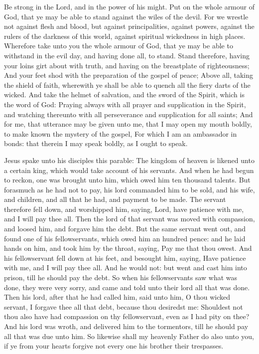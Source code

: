  Be strong in the Lord, and in the power of his might. Put on the whole armour of God, that ye may be able to stand against the wiles of the devil. For we wrestle not against flesh and blood, but against principalities, against powers, against the rulers of the darkness of this world, against spiritual wickedness in high places. Wherefore take unto you the whole armour of God, that ye may be able to withstand in the evil day, and having done all, to stand. Stand therefore, having your loins girt about with truth, and having on the breastplate of righteousness; And your feet shod with the preparation of the gospel of peace; Above all, taking the shield of faith, wherewith ye shall be able to quench all the fiery darts of the wicked. And take the helmet of salvation, and the sword of the Spirit, which is the word of God:
%
Praying always with all prayer and supplication in the Spirit, and watching thereunto with all perseverance and supplication for all saints; And for me, that utterance may be given unto me, that I may open my mouth boldly, to make known the mystery of the gospel, For which I am an ambassador in bonds: that therein I may speak boldly, as I ought to speak.

 Jesus spake unto his disciples this parable: The kingdom of heaven is likened unto a certain king, which would take account of his servants. And when he had begun to reckon, one was brought unto him, which owed him ten thousand talents. But forasmuch as he had not to pay, his lord commanded him to be sold, and his wife, and children, and all that he had, and payment to be made. The servant therefore fell down, and worshipped him, saying, Lord, have patience with me, and I will pay thee all. Then the lord of that servant was moved with compassion, and loosed him, and forgave him the debt. But the same servant went out, and found one of his fellowservants, which owed him an hundred pence: and he laid hands on him, and took him by the throat, saying, Pay me that thou owest. And his fellowservant fell down at his feet, and besought him, saying, Have patience with me, and I will pay thee all. And he would not: but went and cast him into prison, till he should pay the debt. So when his fellowservants saw what was done, they were very sorry, and came and told unto their lord all that was done. Then his lord, after that he had called him, said unto him, O thou wicked servant, I forgave thee all that debt, because thou desiredst me: Shouldest not thou also have had compassion on thy fellowservant, even as I had pity on thee? And his lord was wroth, and delivered him to the tormentors, till he should pay all that was due unto him. So likewise shall my heavenly Father do also unto you, if ye from your hearts forgive not every one his brother their trespasses.

